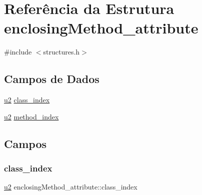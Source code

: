 \hypertarget{structenclosingMethod__attribute}{}\section{Referência da Estrutura enclosing\+Method\+\_\+attribute}
\label{structenclosingMethod__attribute}


{\ttfamily \#include $<$structures.\+h$>$}

\subsection*{Campos de Dados}
\begin{DoxyCompactItemize}
\item 
\hyperlink{lista__operandos_8h_a732cde1300aafb73b0ea6c2558a7a54f}{u2} \hyperlink{structenclosingMethod__attribute_a3f2ebf2e90b6eb973e3fc92d88307c06}{class\+\_\+index}
\item 
\hyperlink{lista__operandos_8h_a732cde1300aafb73b0ea6c2558a7a54f}{u2} \hyperlink{structenclosingMethod__attribute_a86276273eb87b21a7d0bb23daddb0bca}{method\+\_\+index}
\end{DoxyCompactItemize}


\subsection{Campos}
\mbox{\label{structenclosingMethod__attribute_a3f2ebf2e90b6eb973e3fc92d88307c06}} 
\subsubsection{\texorpdfstring{class\+\_\+index}{class\_index}}
{\footnotesize\ttfamily \hyperlink{lista__operandos_8h_a732cde1300aafb73b0ea6c2558a7a54f}{u2} enclosing\+Method\+\_\+attribute\+::class\+\_\+index}

\mbox{\label{structenclosingMethod__attribute_a86276273eb87b21a7d0bb23daddb0bca}} 
